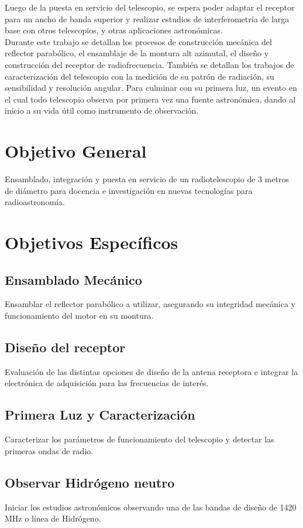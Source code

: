 Luego de la puesta en servicio del telescopio, se espera poder adaptar el receptor para un ancho de banda superior y realizar estudios de interferometría de larga base con otros telescopios, y otras aplicaciones astronómicas.\\

Durante este trabajo se detallan los procesos de construcción mecánica del reflector parabólico, el ensamblaje de la montura alt azimutal, el diseño y construcción del receptor de radiofrecuencia. También se detallan los trabajos de caracterización del telescopio con la medición de su patrón de radiación, su sensibilidad y resolución angular. Para culminar con su primera luz, un evento en el cual todo telescopio observa por primera vez una fuente astronómica, dando al inicio a su vida útil como instrumento de observación.\\


\section{Objetivo General}
Ensamblado, integración y puesta en servicio de un radiotelescopio de 3 metros de diámetro para docencia e investigación en nuevas tecnologías para radioastronomía.

\section{Objetivos Específicos}
\subsection{Ensamblado Mecánico}

Ensamblar el reflector parabólico a utilizar, asegurando su integridad mecánica y funcionamiento del motor en su montura.

\subsection{Diseño del receptor}

Evaluación de las distintas opciones de diseño de la antena receptora e integrar la electrónica de adquisición para las frecuencias de interés.

\subsection{Primera Luz y Caracterización}

Caracterizar los parámetros de funcionamiento del telescopio y detectar las primeras ondas de radio.

\subsection{Observar Hidrógeno neutro}


Iniciar los estudios astronómicos observando una de las bandas de diseño de 1420 MHz o línea de Hidrógeno.